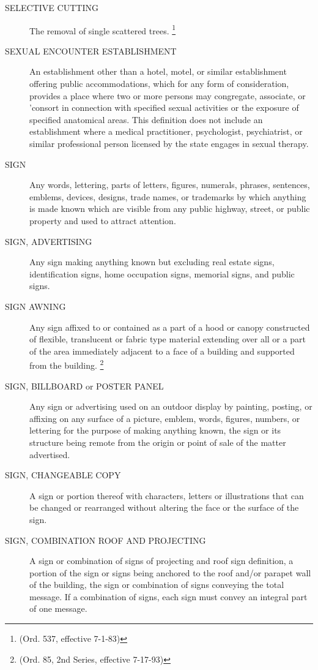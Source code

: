 \begin{description}
    \item[SELECTIVE CUTTING] The removal of single scattered trees. \footnote{(Ord. 537, effective 7-1-83)}
    \item[SEXUAL ENCOUNTER ESTABLISHMENT] An establishment other than a hotel, motel, or similar establishment offering public accommodations, which for any form of consideration, provides a place where two or more persons may congregate, associate, or 'consort in connection with specified sexual activities or the exposure of specified anatomical areas. This definition does not include an establishment where a medical practitioner, psychologist, psychiatrist, or similar professional person licensed by the state engages in sexual therapy.
    \item[SIGN] Any words, lettering, parts of letters, figures, numerals, phrases, sentences, emblems, devices, designs, trade names, or trademarks by which anything is made known which are visible from any public highway, street, or public property and used to attract attention.
    \item[SIGN, ADVERTISING] Any sign making anything known but excluding real estate signs, identification signs, home occupation signs, memorial signs, and public signs.
    \item[SIGN AWNING] Any sign affixed to or contained as a part of a hood or canopy constructed of flexible, translucent or fabric type material extending over all or a part of the area immediately adjacent to a face of a building and supported from the building. \footnote{(Ord. 85, 2nd Series, effective 7-17-93)}
    \item[SIGN, BILLBOARD or POSTER PANEL] Any sign or advertising used on an outdoor display by painting, posting, or affixing on any surface of a picture, emblem, words, figures, numbers, or lettering for the purpose of making anything known, the sign or its structure being remote from the origin or point of sale of the matter advertised.
    \item[SIGN, CHANGEABLE COPY] A sign or portion thereof with characters, letters or illustrations that can be changed or rearranged without altering the face or the surface of the sign.
    \item[SIGN, COMBINATION ROOF AND PROJECTING] A sign or combination of signs of projecting and roof sign definition, a portion of the sign or signs being anchored to the roof and/or parapet wall of the building, the sign or combination of signs conveying the total message.  If a combination of signs, each sign must convey an integral part of one message.

\end{description}
